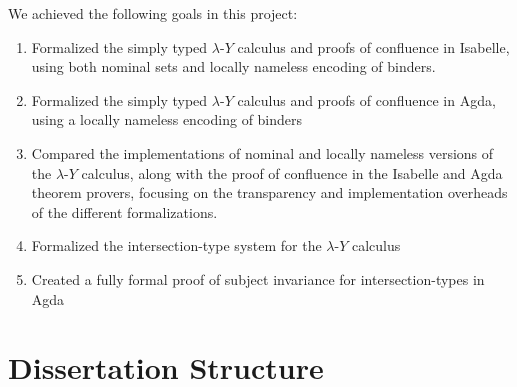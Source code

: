 \documentclass[a4paper, 12pt, twoside]{style/ociamthesis}
\theoremstyle{plain}
\theoremstyle{definition}
\theoremstyle{remark}
\providecommand{\tightlist}{%
  \setlength{\itemsep}{0pt}\setlength{\parskip}{0pt}}
\newcommand{\lamy}{\lambda\text{-}Y}
\begin{document}
We achieved the following goals in this project:

\begin{enumerate}
\def\labelenumi{\arabic{enumi})}
\tightlist
\item
  Formalized the simply typed \(\lamy\) calculus and proofs of
  confluence in Isabelle, using both nominal sets and locally nameless
  encoding of binders.
\item
  Formalized the simply typed \(\lamy\) calculus and proofs of
  confluence in Agda, using a locally nameless encoding of binders
\item
  Compared the implementations of nominal and locally nameless versions
  of the \(\lamy\) calculus, along with the proof of confluence in the
  Isabelle and Agda theorem provers, focusing on the transparency and
  implementation overheads of the different formalizations.
\item
  Formalized the intersection-type system for the \(\lamy\) calculus
\item
  Created a fully formal proof of subject invariance for
  intersection-types in Agda
\end{enumerate}

\section{Dissertation Structure}\label{dissertation-structure}
\end{document}

